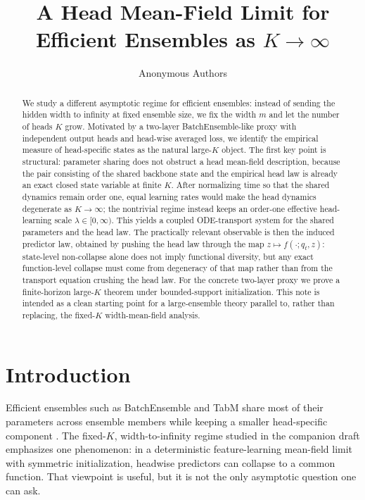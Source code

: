 \documentclass{article}
\title{A Head Mean-Field Limit for Efficient Ensembles as $K\to\infty$}
\author{Anonymous Authors}
\theoremstyle{definition}
\begin{document}
\maketitle

\begin{abstract}
We study a different asymptotic regime for efficient ensembles: instead of sending the hidden width to infinity at fixed ensemble size, we fix the width $m$ and let the number of heads $K$ grow. Motivated by a two-layer BatchEnsemble-like proxy with independent output heads and head-wise averaged loss, we identify the empirical measure of head-specific states as the natural large-$K$ object. The first key point is structural: parameter sharing does not obstruct a head mean-field description, because the pair consisting of the shared backbone state and the empirical head law is already an exact closed state variable at finite $K$. After normalizing time so that the shared dynamics remain order one, equal learning rates would make the head dynamics degenerate as $K\to\infty$; the nontrivial regime instead keeps an order-one effective head-learning scale $\lambda\in[0,\infty)$. This yields a coupled ODE-transport system for the shared parameters and the head law. The practically relevant observable is then the induced predictor law, obtained by pushing the head law through the map $z\mapsto f(\cdot;q_t,z)$: state-level non-collapse alone does not imply functional diversity, but any exact function-level collapse must come from degeneracy of that map rather than from the transport equation crushing the head law. For the concrete two-layer proxy we prove a finite-horizon large-$K$ theorem under bounded-support initialization. This note is intended as a clean starting point for a large-ensemble theory parallel to, rather than replacing, the fixed-$K$ width-mean-field analysis.
\end{abstract}

\section{Introduction}

Efficient ensembles such as BatchEnsemble and TabM share most of their parameters across ensemble members while keeping a smaller head-specific component \citep{batchensemble,tabm}. The fixed-$K$, width-to-infinity regime studied in the companion draft emphasizes one phenomenon: in a deterministic feature-learning mean-field limit with symmetric initialization, headwise predictors can collapse to a common function. That viewpoint is useful, but it is not the only asymptotic question one can ask.
\end{document}
